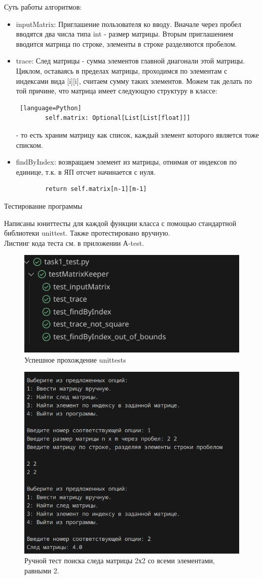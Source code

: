 Суть работы алгоритмов:
\begin{itemize}
	\item inputMatrix: Приглашение пользователя ко вводу. Вначале через пробел вводятся два числа типа int - размер матрицы. Вторым приглашением вводится матрица по строке, элементы в строке разделяются пробелом.
	\item trace: След матрицы - сумма элементов главной диагонали этой матрицы. Циклом, оставаясь в пределах матрицы, проходимся по элементам с индексами вида [i][i], считаем сумму таких элементов. Можем так делать по той причине, что матрица имеет следующую структуру в классе:\vspace{3cm}
	\begin{lstlisting} [language=Python]
		self.matrix: Optional[List[List[float]]]
		\end{lstlisting} - то есть храним матрицу как список, каждый элемент которого является тоже списком.
	\item findByIndex: возвращаем элемент из матрицы, отнимая от индексов по единице, т.к. в ЯП отсчет начинается с нуля.
	\begin{lstlisting}
		return self.matrix[n-1][m-1]
	\end{lstlisting}
\end{itemize}
\begin{large}
	Тестирование программы\\
\end{large}
Написаны юниттесты для каждой функции класса с помощью стандартной библиотеки unittest. Также протестировано вручную.\\
Листинг кода теста см. в приложении А-test.\\
\begin{figure}[H]
	\centering
	\includegraphics[width=0.5\linewidth]{tests-task1}
	\caption*{Успешное прохождение unittests}
	\label{fig:tests-task1}
\end{figure}
\begin{figure}[H]
	\centering
	\includegraphics[width=0.5\linewidth]{tests-task2}
	\caption*{Ручной тест поиска следа матрицы 2х2 со всеми элементами, равными 2.}
	\label{fig:tests-task2}
\end{figure}

